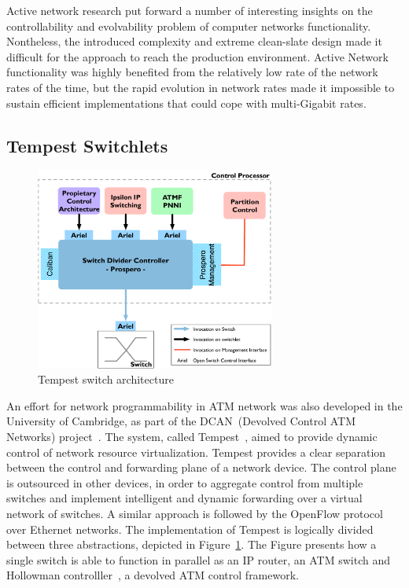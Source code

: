 Active network research put forward a number of interesting insights on the
controllability and evolvability problem of computer networks functionality.
Nontheless, the introduced complexity and extreme clean-slate design made it
difficult for the approach to reach the production environment. Active Network
functionality was highly benefited from the relatively low rate of the network
rates of the time, but the rapid evolution in network rates made it impossible
to sustain efficient implementations that could cope with multi-Gigabit rates. 

\subsection{Tempest Switchlets}

\begin{figure}
  \begin{center}
\includegraphics[width=0.7\textwidth]{tempest_arch}
\caption{Tempest switch architecture~\cite{UCAM-CL-TR-450}}
\label{fig:background:tempest_arch}
\end{center}
\end{figure}

An effort for network programmability in ATM network was also developed in the
University of Cambridge, as part of the DCAN~(Devolved Control ATM Networks)
project~\cite{dcan}.  The system, called Tempest~\cite{Rooney1998}, aimed to
provide dynamic control of network resource virtualization. Tempest provides a
clear separation between the control and forwarding plane of a network device.
The control plane is outsourced in other devices, in order to aggregate control
from multiple switches and implement intelligent and dynamic forwarding over a
virtual network of switches.  A similar approach is followed by the OpenFlow
protocol over Ethernet networks.  The implementation of Tempest is logically
divided between three abstractions, depicted in
Figure~\ref{fig:background:tempest_arch}. The Figure presents how a single
switch is able to function in parallel as an IP router, an ATM switch and 
Hollowman controlller~\cite{Rooney1997}, a devolved ATM control framework. 

